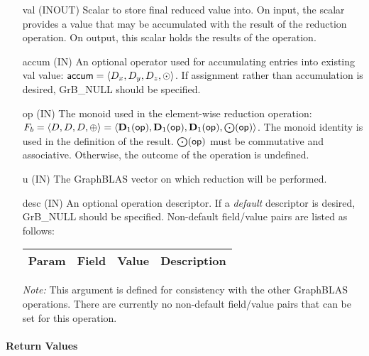 \begin{itemize}[leftmargin=1.1in]
    \item[{\sf val}]    ({\sf INOUT}) Scalar to store final reduced value into. On input,
    the scalar provides a value that may be accumulated with the result of the
    reduction operation.  On output, this scalar holds the results of the
    operation.

    \item[{\sf accum}]    ({\sf IN}) An optional operator used for accumulating
    entries into existing {\sf val} value: ${\sf accum} = \langle D_x,
    D_y, D_z,\odot \rangle$. If assignment rather than accumulation is
    desired, {\sf GrB\_NULL} should be specified.

    \item[{\sf op}]    ({\sf IN}) The monoid 
    used in the element-wise reduction operation:
    $F_b=\langle D,D,D,\oplus \rangle = \langle \bold{D}_1({\sf op}), \bold{D}_1({\sf op}),
    \bold{D}_1({\sf op}),\bold{\bigodot}({\sf op})\rangle$.
    The monoid identity is used in the definition of the result.
    $\bold{\bigodot}({\sf op})$ must be commutative and associative. Otherwise, the outcome of the operation is undefined.
    
    \item[{\sf u}]     ({\sf IN}) The GraphBLAS vector on which
	    reduction will be performed.

    \item[{\sf desc}] ({\sf IN}) An optional operation descriptor. If
    a \emph{default} descriptor is desired, {\sf GrB\_NULL} should be
    specified. Non-default field/value pairs are listed as follows:  \\

    \begin{tabular}{lllp{2.5in}}
        Param & Field  & Value & Description \\
        \hline
    \end{tabular}

    \emph{Note:} This argument is defined for consistency with the other GraphBLAS operations.
    There are currently no non-default field/value pairs that can be set for this operation.
\end{itemize}

\paragraph{Return Values}

